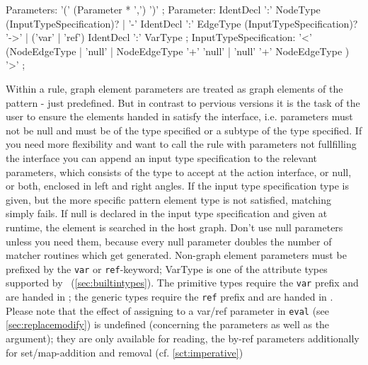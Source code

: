 \begin{rail}
  Parameters: '(' (Parameter * ',') ')' ;
  Parameter: IdentDecl ':' NodeType (InputTypeSpecification)? | '-' IdentDecl ':' EdgeType (InputTypeSpecification)? '->' | ('var' | 'ref') IdentDecl ':' VarType ;
  InputTypeSpecification: '<' (NodeEdgeType | 'null' | NodeEdgeType '+' 'null' | 'null' '+' NodeEdgeType ) '>' ;
\end{rail}

Within a rule, graph element parameters are treated as graph elements of the pattern - just predefined.
But in contrast to pervious versions it is the task of the user to ensure the elements handed in satisfy the interface, i.e. parameters must not be null and must be of the type specified or a subtype of the type specified. 
If you need more flexibility and want to call the rule with parameters not fullfilling the interface you can append an input type specification to the relevant parameters, which consists of the type to accept at the action interface, or null, or both, enclosed in left and right angles. 
If the input type specification type is given, but the more specific pattern element type is not satisfied, matching simply fails.
If null is declared in the input type specification and given at runtime, the element is searched in the host graph.
Don't use null parameters unless you need them, because every null parameter doubles the number of matcher routines which get generated.
Non-graph element parameters must be prefixed by the \texttt{var} or \texttt{ref}-keyword; 
VarType is one of the attribute types supported by \GrG\ (\ref{sec:builtintypes}).
The primitive types require the \texttt{var} prefix and are handed in ; 
the generic types require the \texttt{ref} prefix and are handed in .
Please note that the effect of assigning to a var/ref parameter in \texttt{eval} (see \ref{sec:replacemodify}) is undefined (concerning the parameters as well as the argument);
they are only available for reading, the by-ref parameters additionally for set/map-addition and removal (cf. \ref{sct:imperative})


